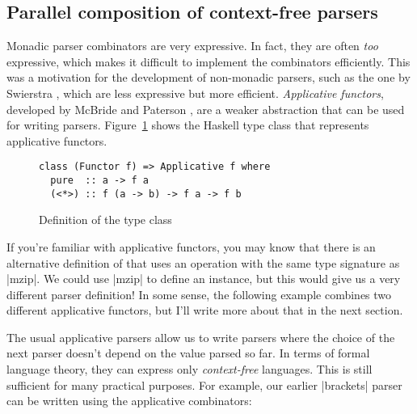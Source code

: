 \documentclass{tmr}
\newcommand{\authornote}[3]{}
\newcommand\bay[1]{\authornote{brent}{blue}{#1}}
\newcommand\tp[1]{\authornote{tomas}{red}{#1}}
\begin{document}
\subsection{Parallel composition of context-free parsers}

Monadic parser combinators are very expressive. In fact, they are
often \textit{too} expressive, which makes it difficult to implement
the combinators efficiently. This was a motivation for the development
of non-monadic parsers, such as the one by Swierstra
\cite{deterparser, parsingtutorial}, which are less expressive but
more efficient.  \textit{Applicative functors}, developed by McBride
and Paterson \cite{applicative}, are a weaker abstraction that can be
used for writing parsers. Figure~\ref{fig:applicative} shows the
Haskell type class  that represents applicative
functors.
\begin{figure}
\begin{verbatim}
class (Functor f) => Applicative f where
  pure  :: a -> f a
  (<*>) :: f (a -> b) -> f a -> f b
\end{verbatim}
\caption{Definition of the  type class}
\label{fig:applicative}
\end{figure}

If you're familiar with applicative functors, you may know that there is an alternative definition 
of  that uses an operation with the same type signature as |mzip|. We could use 
|mzip| to define an  instance, but this would give us a very different parser definition!
In some sense, the following example combines two different applicative functors, but I'll write more 
about that in the next section.

\bay{I suggest removing this paragraph,
  since it doesn't really add much to the present discussion, and just
leaving the discussion of this for later.}
\tp{I'd like to keep something here - again, this was suggested to me by someone. People who know 
  the alternative definition probably expect that mzip is somehow related to the applicative functor,
  so I wanted to clarify this early. }

The usual applicative parsers allow us to write parsers where the choice of the next parser 
doesn't depend on the value parsed so far. In terms of formal language theory, they can express 
only \textit{context-free} languages. This is still sufficient for many practical purposes. For 
example, our earlier |brackets| parser can be written using the applicative combinators:
\end{document}
